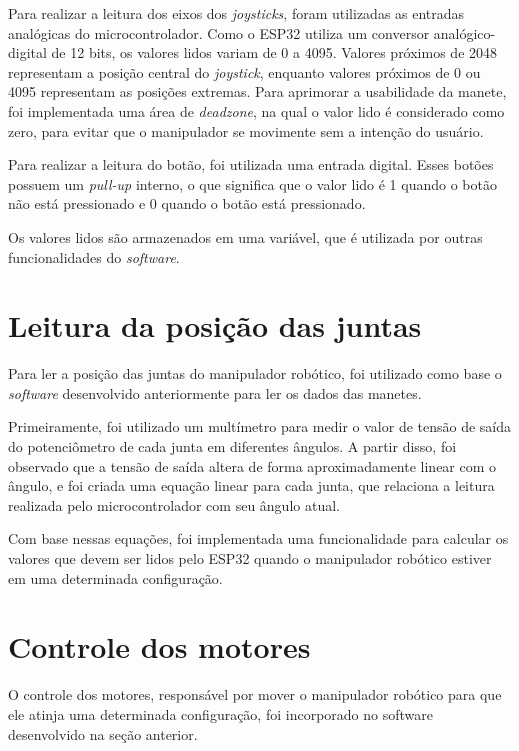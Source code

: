 Para realizar a leitura dos eixos dos \textit{joysticks}, foram utilizadas as entradas analógicas do microcontrolador.
Como o ESP32 utiliza um conversor analógico-digital de 12 bits, os valores lidos variam de 0 a 4095.
Valores próximos de 2048 representam a posição central do \textit{joystick}, enquanto valores próximos de 0 ou 4095 representam as posições extremas.
Para aprimorar a usabilidade da manete, foi implementada uma área de \textit{deadzone}, na qual o valor lido é considerado como zero,
para evitar que o manipulador se movimente sem a intenção do usuário.

Para realizar a leitura do botão, foi utilizada uma entrada digital.
Esses botões possuem um \textit{pull-up} interno, o que significa que o valor lido é 1 quando o botão não está pressionado e 0 quando o botão está pressionado.

Os valores lidos são armazenados em uma variável, que é utilizada por outras funcionalidades do \textit{software}.

\section[Leitura da posição das juntas]{Leitura da posição das juntas}
\label{sec:leituraPosicaoJuntas}

Para ler a posição das juntas do manipulador robótico, foi utilizado como base o \textit{software} desenvolvido anteriormente para ler os dados das manetes.

Primeiramente, foi utilizado um multímetro para medir o valor de tensão de saída do potenciômetro de cada junta em diferentes ângulos.
A partir disso, foi observado que a tensão de saída altera de forma aproximadamente linear com o ângulo,
e foi criada uma equação linear para cada junta, que relaciona a leitura realizada pelo microcontrolador com seu ângulo atual.

Com base nessas equações, foi implementada uma funcionalidade para calcular os valores que devem ser lidos pelo ESP32 quando o manipulador robótico estiver em uma determinada configuração.

\section[Controle dos motores]{Controle dos motores}
\label{sec:controleMotores}

O controle dos motores, responsável por mover o manipulador robótico para que ele atinja uma determinada configuração,
foi incorporado no software desenvolvido na seção anterior.

